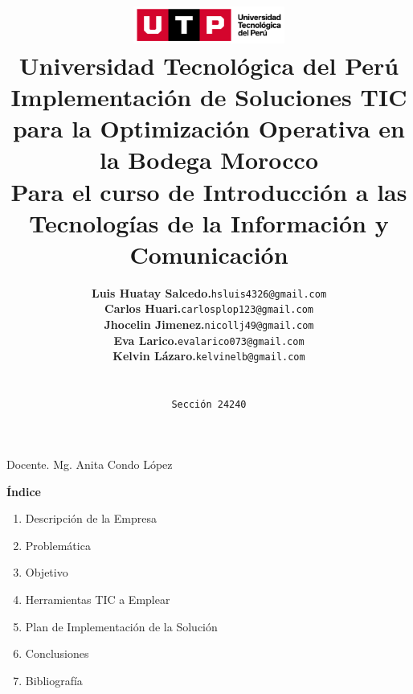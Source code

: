 \documentclass{article}
\title{
  \includegraphics[width=5cm]{./assets/logo-utp.png} \\
  \vspace{1cm}
  \textbf{Universidad Tecnológica del Perú} \\
  \vspace{2cm}
  \textbf{Implementación de Soluciones TIC para la Optimización Operativa en la Bodega Morocco} \\
  \vspace{1cm}
  \large \textbf{Para el curso de Introducción a las Tecnologías de la Información y Comunicación} \\
}
\author{
  \begin{tabular}{ll}
    \textbf{Luis Huatay Salcedo.} & \texttt{hsluis4326@gmail.com} \\
    \textbf{Carlos Huari.} & \texttt{carlosplop123@gmail.com} \\
    \textbf{Jhocelin Jimenez.} & \texttt{nicollj49@gmail.com} \\
    \textbf{Eva Larico.} & \texttt{evalarico073@gmail.com} \\
    \textbf{Kelvin Lázaro.} & \texttt{kelvinelb@gmail.com} \\
  \end{tabular} \\\\
  \texttt{Sección 24240}
}
\newenvironment{indexPart}{}{}
\begin{document}
\maketitle

\begin{center}
  Docente. Mg. Anita Condo López  
\end{center}
\restoregeometry

\newpage

\begin{indexPart}
  \begin{center}
    \textbf{\Large Índice}
  \end{center}
  \begin{spacing}{1.5}
    \noindent
    \begin{enumerate}
      \item Descripción de la Empresa
      \item Problemática
      \item Objetivo
      \item Herramientas TIC a Emplear
      \item Plan de Implementación de la Solución
      \item Conclusiones
      \item Bibliografía
    \end{enumerate}
  \end{spacing}
\end{indexPart}

\newpage
\end{document}
